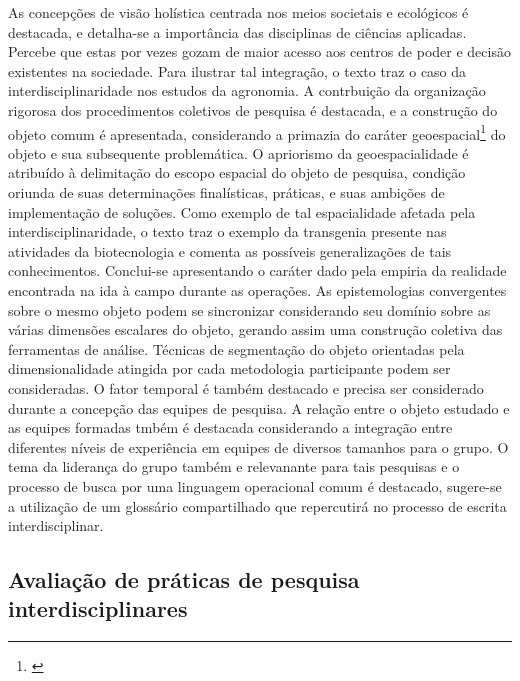 \documentclass[
   article,       %
   12pt,          %
   oneside,       %
   a4paper,       %
   english,       %
   brazil,           %
   sumario=tradicional
   ]{abntex2}
\begin{document}
As concepções de visão holística centrada nos meios societais e ecológicos é destacada, e detalha-se a importância das disciplinas de ciências aplicadas. Percebe que estas por vezes gozam de maior acesso aos centros de poder e decisão existentes na sociedade. Para ilustrar tal integração, o texto traz o caso da interdisciplinaridade nos estudos da agronomia. A contrbuição da organização rigorosa dos procedimentos coletivos de pesquisa é destacada, e a construção do objeto comum é apresentada, considerando a primazia do caráter geoespacial\footnote{\cite[p.118]{Interdisciplinares_Consolidados}} do objeto e sua subsequente problemática. O apriorismo da geoespacialidade é atribuído à delimitação do escopo espacial do objeto de pesquisa, condição oriunda de suas determinações finalísticas, práticas, e suas ambições de implementação de soluções. Como exemplo de tal espacialidade afetada pela  interdisciplinaridade, o texto traz o exemplo da transgenia presente nas atividades da biotecnologia e comenta as possíveis generalizações de tais conhecimentos. Conclui-se apresentando o caráter dado pela empiria da realidade encontrada na ida à campo durante as operações. As epistemologias convergentes sobre o mesmo objeto podem se sincronizar considerando seu domínio sobre as várias dimensões escalares do objeto, gerando assim uma construção coletiva das ferramentas de análise. Técnicas de segmentação do objeto orientadas pela dimensionalidade atingida por cada metodologia participante podem ser consideradas. O fator temporal é também destacado e precisa ser considerado durante a concepção das equipes de pesquisa. A relação entre o objeto estudado e as equipes formadas tmbém é destacada considerando a integração entre diferentes níveis de experiência em equipes de diversos tamanhos para o grupo. O tema da liderança do grupo também e relevanante para tais pesquisas e o processo de busca por uma linguagem operacional comum é destacado, sugere-se a utilização de um glossário compartilhado que repercutirá no processo de escrita interdisciplinar.


\subsection{Avaliação de práticas de pesquisa interdisciplinares}
\end{document}
